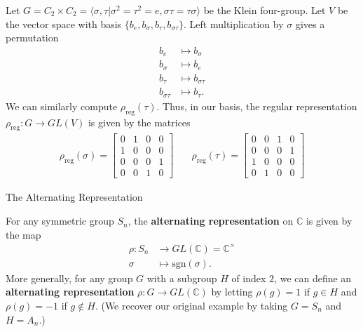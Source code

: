 \begin{frame}[plain]
\begin{example}
Let $G= C_2 \times C_2 = \langle \sigma, \tau | \sigma^2 = \tau^2 = e, \sigma \tau = \tau \sigma \rangle$ be the Klein four-group.  Let $V$ be the vector space with basis $\{ b_e, b_\sigma, b_\tau, b_{\sigma \tau} \}$.  Left multiplication by $\sigma$ gives a permutation 
\begin{align*}
b_e &\mapsto b_\sigma\\
b_\sigma &\mapsto b_e \\
b_ \tau &\mapsto b_{\sigma \tau}\\
b_{\sigma \tau} &\mapsto b_\tau.
\end{align*}
We can similarly compute $\rho_{\text{reg}}(\tau)$.  Thus, in our basis, the regular representation $\rho_{\text{reg}} \colon G \to GL(V)$  is given by the matrices
\begin{align*}
 \rho_{\text{reg}}(\sigma) = \begin{bmatrix}0 & 1 & 0 & 0 \\  1 & 0 & 0 & 0 \\ 0 & 0 & 0 & 1 \\ 0 & 0 & 1 & 0 \end{bmatrix} & \quad \rho_{\text{reg}}(\tau) = \begin{bmatrix}0&0&1&0 \\ 0&0&0&1 \\ 1&0&0&0 \\ 0&1&0&0 \end{bmatrix} \end{align*}
\end{example}
\end{frame}

\begin{frame}{The Alternating Representation}
\begin{example}
For any symmetric group $S_n$, the \textbf{alternating representation} on $\mathbb{C}$ is given by the map 
\begin{align*}
\rho \colon S_n &\to GL(\mathbb{C})=\mathbb{C}^\times \\
\sigma & \mapsto \text{sgn}(\sigma).
\end{align*} More generally, for any group $G$ with a subgroup $H$ of index $2$, we can define an \textbf{alternating representation} $\rho \colon G \to GL(\mathbb{C})$ by letting $\rho(g) = 1$ if $g \in H$ and $\rho(g) = -1$ if $g \notin H$.  (We recover our original example  by taking $G= S_n$ and $H=A_n$.) 
\end{example}
\end{frame}

